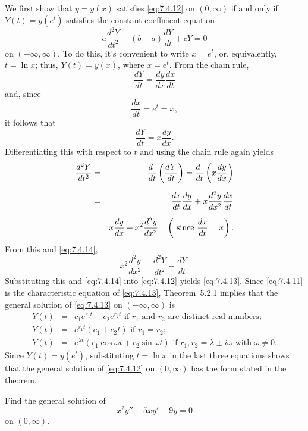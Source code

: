 \proof We first show that $y=y(x)$ satisfies \eqref{eq:7.4.12} on $(0,\infty)$ if and only if
$Y(t)=y(e^{t})$ satisfies the constant coefficient equation
\begin{equation}
  \label{eq:7.4.13}a\frac{d^{2}Y}{dt^{2}}+(b-a)\frac{dY}{dt}+cY=0
\end{equation}
on $(-\infty,\infty)$. To do this, it's convenient to write $x=e^{t}$, or, equivalently, $t=\ln x$;
thus, $Y(t)=y(x)$, where $x=e^{t}$. From the chain rule,
\[
  \frac{dY}{dt}=\frac{dy}{dx}\frac{dx}{dt}
\]
and, since
\[
  \frac{dx}{dt}=e^{t}=x,
\]
it follows that
\begin{equation}
  \label{eq:7.4.14}\frac{dY}{dt}=x\frac{dy}{dx}.
\end{equation}
Differentiating this with respect to $t$ and using the chain rule again yields
\begin{eqnarray*}
  {\frac{d^{2}Y}{dt^{2}}} & = & \frac{d\phantom{t}}{dt}\left(\frac{dY}{dt}\right)=\frac{d\phantom{t}}{dt}\left(x\frac{dy}{dx}\right) \\[2\jot]
                          & = & \frac{dx}{dt}\frac{dy}{dx}+x\frac{d^{2}y}{dx^{2}}\frac{dx}{dt}                                       \\[2\jot]
                          & = & x\frac{dy}{dx}+x^{2}\frac{d^{2}y}{dx^{2}}\quad\left(\mbox{ since }{\frac{dx}{dt}}=x\right).
\end{eqnarray*}
From this and \eqref{eq:7.4.14},
\[
  x^{2}\frac{d^{2}y}{dx^{2}}=\frac{d^{2}Y}{dt^{2}}-\frac{dY}{dt}.
\]
Substituting this and \eqref{eq:7.4.14} into \eqref{eq:7.4.12} yields \eqref{eq:7.4.13}. Since
\eqref{eq:7.4.11} is the characteristic equation of \eqref{eq:7.4.13}, Theorem~5.2.1 implies that
the general solution of \eqref{eq:7.4.13} on $(-\infty,\infty)$ is
\begin{eqnarray*}
  Y(t) & = & c_{1}e^{r_{1}t}+c_{2}e^{r_{2}t}\mbox{ if $r_{1}$ and $r_{2}$ are distinct real numbers; } \\
  Y(t) & = & e^{r_{1}t}(c_{1}+c_{2}t)\mbox{ if $r_{1}=r_{2}$; }                                        \\
  Y(t) & = & e^{\lambda t}\left(c_{1}\cos\omega t+c_{2}\sin\omega t\right)\mbox{ if $r_{1},r_{2}=\lambda\pm i\omega$ with $\omega\ne0$}.
\end{eqnarray*}
Since $Y(t)=y(e^{t})$, substituting $t=\ln x$ in the last three equations shows that the general
solution of \eqref{eq:7.4.12} on $(0,\infty)$ has the form stated in the theorem.

\begin{example}
  \label{example:7.4.6} \rm Find the general solution of
  \begin{equation}
    \label{eq:7.4.15}x^{2}y''-5xy'+9y=0
  \end{equation}
  on $(0,\infty)$.
\end{example}

